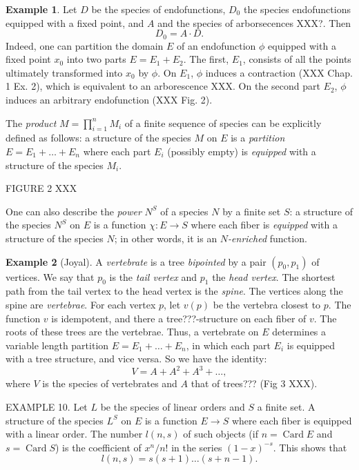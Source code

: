 \documentclass{article}
\theoremstyle{definition}
\newtheorem{ex}{Example}
\theoremstyle{remark}
\DeclareMathOperator{\Card}{Card}
\newcommand{\term}[1]{\emph{#1}}
\begin{document}
\begin{ex}
Let $D$ be the species of endofunctions, $D_0$ the species
endofunctions equipped with a fixed point, and $A$ and the species of arborsecences XXX?. Then
\[ D_0 = A \cdot D. \]
Indeed, one can partition the domain $E$ of an endofunction $\phi$ equipped with a
fixed point $x_0$ into two parts $E = E_1 + E_2$. The first, $E_1$, consists of
all the points ultimately transformed into $x_0$ by $\phi$. On $E_1$, $\phi$ induces
a contraction (XXX Chap. 1 Ex. 2), which is equivalent to an arborescence XXX. On
the second part $E_2$, $\phi$ induces an arbitrary endofunction (XXX
Fig. 2).
\end{ex}

The \emph{product} $M = \prod_{i=1}^n M_i$ of a finite sequence of
species can be explicitly defined as follows: a structure of the
species $M$ on $E$ is a \emph{partition} $E = E_1 + \dots + E_n$ where
each part $E_i$ (possibly empty) is \emph{equipped} with a structure
of the species $M_i$.

FIGURE 2 XXX

One can also describe the \term{power} $N^S$ of a species $N$ by a
finite set $S$: a structure of the species $N^S$ on $E$ is a function
$\chi : E \to S$ where each fiber is \emph{equipped} with a structure
of the species $N$; in other words, it is an \emph{$N$-enriched}
function.


\begin{ex}[Joyal]
  A \emph{vertebrate} is a tree \term{bipointed} by a pair $(p_0,
  p_1)$ of vertices. We say that $p_0$ is the \term{tail vertex} and
  $p_1$ the \term{head vertex}. The shortest path from the tail vertex
  to the head vertex is the \term{spine}. The vertices along the spine
  are \term{vertebrae}. For each vertex $p$, let $v(p)$ be the
  vertebra closest to $p$. The function $v$ is idempotent, and there a
  tree???-structure on each fiber of $v$.  The roots of these trees
  are the vertebrae. Thus, a vertebrate on $E$ determines a variable
  length partition $E = E_1 + \dots + E_n$, in which each part $E_i$
  is equipped with a tree structure, and vice versa. So we have the
  identity:
  \[ V = A + A^2 + A^3 + \dots, \] where $V$ is the species of
  vertebrates and $A$ that of trees??? (Fig 3 XXX).
\end{ex}

EXAMPLE 10. Let $L$ be the species of linear orders and $S$ a finite set.
A structure of the species $L^S$ on $E$ is a function $E \to S$ where each
fiber is equipped with a linear order. The number $l(n, s)$ of such objects (if
$n = \Card E$ and $s = \Card S$) is the coefficient of $x^n/n!$ in the series
$(1-x)^{-s}$. This shows that
\[ l(n, s) = s (s + 1) \dots (s + n-1). \]
\end{document}

